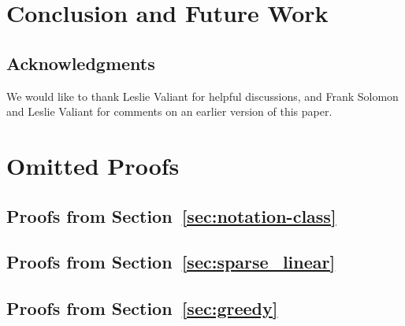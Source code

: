 \documentclass[11pt]{article}
\begin{document}
\section{Conclusion and Future Work}
\label{sec:conclusion}


\subsection*{Acknowledgments} 
We would like to thank Leslie Valiant for helpful discussions, and Frank Solomon
and Leslie Valiant for comments on an earlier version of this paper.




\newpage
\appendix 
\section{Omitted Proofs}

\subsection{Proofs from Section~\ref{sec:notation-class}}
\label{app:notation-class}


\subsection{Proofs from Section~\ref{sec:sparse_linear}}
\label{app:sparse_linear}


\subsection{Proofs from Section~\ref{sec:greedy}}
\label{app:greedy}

\end{document}
